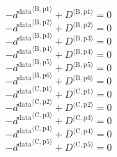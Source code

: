 \begin{equation}
-{d^{\mathrm{data}}}^{\langle \mathrm{\mathrm{B}},\mathrm{\mathrm{p1}}\rangle} + {D}^{\langle \mathrm{B},\mathrm{p1}\rangle} = 0
\end{equation}
\begin{equation}
-{d^{\mathrm{data}}}^{\langle \mathrm{\mathrm{B}},\mathrm{\mathrm{p2}}\rangle} + {D}^{\langle \mathrm{B},\mathrm{p2}\rangle} = 0
\end{equation}
\begin{equation}
-{d^{\mathrm{data}}}^{\langle \mathrm{\mathrm{B}},\mathrm{\mathrm{p3}}\rangle} + {D}^{\langle \mathrm{B},\mathrm{p3}\rangle} = 0
\end{equation}
\begin{equation}
-{d^{\mathrm{data}}}^{\langle \mathrm{\mathrm{B}},\mathrm{\mathrm{p4}}\rangle} + {D}^{\langle \mathrm{B},\mathrm{p4}\rangle} = 0
\end{equation}
\begin{equation}
-{d^{\mathrm{data}}}^{\langle \mathrm{\mathrm{B}},\mathrm{\mathrm{p5}}\rangle} + {D}^{\langle \mathrm{B},\mathrm{p5}\rangle} = 0
\end{equation}
\begin{equation}
-{d^{\mathrm{data}}}^{\langle \mathrm{\mathrm{B}},\mathrm{\mathrm{p6}}\rangle} + {D}^{\langle \mathrm{B},\mathrm{p6}\rangle} = 0
\end{equation}
\begin{equation}
-{d^{\mathrm{data}}}^{\langle \mathrm{\mathrm{C}},\mathrm{\mathrm{p1}}\rangle} + {D}^{\langle \mathrm{C},\mathrm{p1}\rangle} = 0
\end{equation}
\begin{equation}
-{d^{\mathrm{data}}}^{\langle \mathrm{\mathrm{C}},\mathrm{\mathrm{p2}}\rangle} + {D}^{\langle \mathrm{C},\mathrm{p2}\rangle} = 0
\end{equation}
\begin{equation}
-{d^{\mathrm{data}}}^{\langle \mathrm{\mathrm{C}},\mathrm{\mathrm{p3}}\rangle} + {D}^{\langle \mathrm{C},\mathrm{p3}\rangle} = 0
\end{equation}
\begin{equation}
-{d^{\mathrm{data}}}^{\langle \mathrm{\mathrm{C}},\mathrm{\mathrm{p4}}\rangle} + {D}^{\langle \mathrm{C},\mathrm{p4}\rangle} = 0
\end{equation}
\begin{equation}
-{d^{\mathrm{data}}}^{\langle \mathrm{\mathrm{C}},\mathrm{\mathrm{p5}}\rangle} + {D}^{\langle \mathrm{C},\mathrm{p5}\rangle} = 0
\end{equation}
